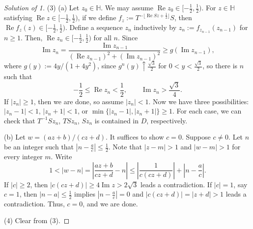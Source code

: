 \documentclass[a4paper]{article}
\theoremstyle{definition}
\renewcommand{\Re}{\operatorname{Re}}
\renewcommand{\Im}{\operatorname{Im}}
\renewcommand{\H}{\mathbb{H}}
\begin{document}
\begin{proof}[Solution of 1]

(3)
(a)
Let $z_0\in\H$.
We may assume $\Re z_0\in[-\frac12,\frac12)$.
For $z\in\H$ satisfying $\Re z\in[-\frac12,\frac12)$, if we define $f_z:=T^{-\lfloor\Re Sz+\frac12\rfloor}S$, then $\Re f_z(z)\in[-\frac12,\frac12)$.
Define a sequence $z_n$ inductively by $z_n:=f_{z_{n-1}}(z_{n-1})$ for $n\ge1$.
Then, $\Re z_n\in[-\frac12,\frac12)$ for all $n$.
Since
\[\Im z_n=\frac{\Im z_{n-1}}{(\Re z_{n-1})^2+(\Im z_{n-1})^2}\ge g(\Im z_{n-1}),\]
where $g(y):=4y/(1+4y^2)$, since $g^n(y)\uparrow\frac{\sqrt3}2$ for $0<y<\frac{\sqrt3}2$, so there is $n$ such that
\[-\frac12\le\Re z_n<\frac12,\qquad\Im z_n>\frac{\sqrt3}4.\]
If $|z_n|\ge1$, then we are done, so assume $|z_n|<1$.
Now we have three possibilities: $|z_n-1|<1$, $|z_n+1|<1$, or $\min\{|z_n-1|,|z_n+1|\}\ge1$.
For each case, we can check that $T^{-1}Sz_n$, $TSz_n$, $Sz_n$ is contained in $D$, respectively.

(b)
Let $w=(az+b)/(cz+d)$.
It suffices to show $c=0$.
Suppose $c\ne0$.
Let $n$ be an integer such that $|n-\frac ac|\le\frac12$.
Note that $|z-m|>1$ and $|w-m|>1$ for every integer $m$.
Write
\[1<|w-n|=\left|\frac{az+b}{cz+d}-n\right|\le\left|\frac1{c(cz+d)}\right|+\left|n-\frac ac\right|.\]
If $|c|\ge2$, then $|c(cz+d)|\ge4\Im z>2\sqrt3$
leads a contradiction.
If $|c|=1$, say $c=1$, then $|n-a|\le\frac12$ implies $|n-\frac ac|=0$ and $|c(cz+d)|=|z+d|>1$ leads a contradiction.
Thus, $c=0$, and we are done.

(4)
Clear from (3).
\end{proof}
\end{document}
